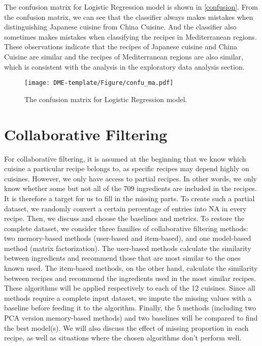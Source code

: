 \documentclass{article}
\begin{document}
The confusion matrix for Logistic Regression model is shown in \autoref{confusion}. From the confusion matrix, we can see that the classifier always makes mistakes when distinguishing Japanese cuisine from China Cuisine. And the classifier also sometimes makes mistakes when classifying the recipes in Mediterranean regions. These observations indicate that the recipes of Japanese cuisine and China Cuisine are similar and the recipes of Mediterranean regions are also similar, which is consistent with the analysis in the exploratory data analysis section.

\begin{figure}[ht]
\vskip -6mm
\centering
\texttt{[image: DME-template/Figure/confu\_ma.pdf]}
\vskip -3mm
\caption{The confusion matrix for Logistic Regression model.}
\label{confusion} 
\vskip -9mm
\end{figure}

\section{Collaborative Filtering}
For collaborative filtering, it is assumed at the beginning that we know which cuisine a particular recipe belongs to, as specific recipes may depend highly on cuisines. However, we only have access to partial recipes. In other words, we only know whether some but not all of the 709 ingredients are included in the recipes. It is therefore a target for us to fill in the missing parts. To create such a partial dataset, we randomly convert a certain percentage of entries into NA in every recipe. Then, we discuss and choose the baselines and metrics. To restore the complete dataset, we consider three families of collaborative filtering methods: two memory-based methods (user-based and item-based), and one model-based method (matrix factorization). The user-based methods calculate the similarity between ingredients and recommend those that are most similar to the ones known used. The item-based methods, on the other hand, calculate the similarity between recipes and recommend the ingredients used in the most similar recipes. These algorithms will be applied respectively to each of the 12 cuisines. Since all methods require a complete input dataset, we impute the missing values with a baseline before feeding it to the algorithm. Finally, the 5 methods (including two PCA version memory-based methods) and two baselines will be compared to find the best model(s). We will also discuss the effect of missing proportion in each recipe, as well as situations where the chosen algorithms don't perform well.
\end{document}
